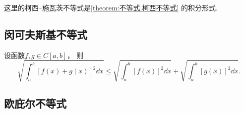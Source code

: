 这里的柯西--施瓦茨不等式是\cref{theorem:不等式.柯西不等式} 的积分形式.

\subsection{闵可夫斯基不等式}
\begin{theorem}[闵可夫斯基不等式]\label{theorem:定积分.闵可夫斯基不等式}
设函数\(f,g \in C[a,b]\)，
则\begin{equation}\label{equation:定积分.闵可夫斯基不等式}
	\sqrt{ \int_a^b [f(x)+g(x)]^2 \dd{x} }
	\leq \sqrt{ \int_a^b [f(x)]^2 \dd{x} }
			+ \sqrt{ \int_a^b [g(x)]^2 \dd{x} }.
\end{equation}
\end{theorem}

\subsection{欧庇尔不等式}
